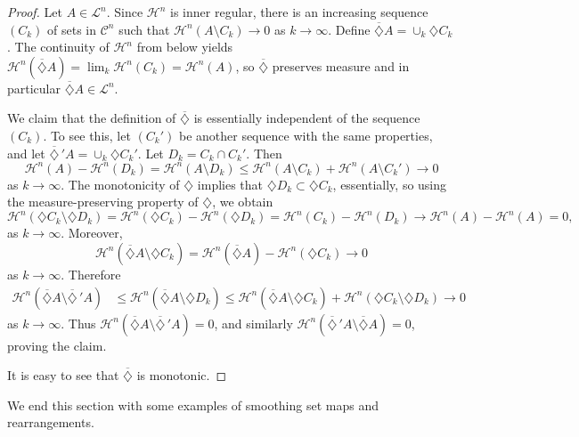 \documentclass[12pt,reqno]{amsart}
\newcommand{\cH}{{\mathcal H}}
\newcommand{\cL}{\mathcal L}
\newcommand{\di}{\diamondsuit}
\numberwithin{equation}{section}
\begin{document}
\begin{proof}
Let $A\in \cL^n$.  Since $\cH^n$ is inner regular, there is an increasing sequence $(C_k)$ of sets in ${\mathcal{C}}^n$ such that $\cH^n(A\setminus C_k)\to 0$ as $k\to\infty$. Define $\overline{\di} A=\cup_k \di C_k$.  The continuity of $\cH^n$ from below yields $\cH^n\left(\overline{\di}A\right)=\lim_k \cH^n(C_k)=\cH^n(A)$, so $\overline{\di}$ preserves measure and in particular $\overline{\di} A\in \cL^n$.

We claim that the definition of $\overline{\di}$ is essentially independent of the sequence $(C_k)$.  To see this, let $(C_k\!')$ be another sequence with the same properties, and let $\overline{\di}\,' A=\cup_k \di C_k\!'$. Let $D_k=C_k\cap C_k\!'$.  Then
$$\cH^n(A)-\cH^n(D_k)=\cH^n(A\setminus D_k)\le \cH^n(A\setminus C_k)+\cH^n(A\setminus C_k\!')\to 0$$
as $k\to \infty$. The monotonicity of $\di$ implies that $\di D_k\subset \di C_k$, essentially, so using the measure-preserving property of $\di$, we obtain
\[
\cH^n(\di C_k\setminus \di D_k)=\cH^n(\di C_k)-\cH^n(\di D_k)=\cH^n(C_k)-\cH^n(D_k)\to \cH^n(A)-\cH^n(A)=0,
\]
as $k\to\infty$.  Moreover,
$$\cH^n\left(\overline{\di} A\setminus\di C_k\right)=\cH^n\left(\overline{\di} A\right)-\cH^n(\di C_k)\to 0$$
as $k\to\infty$.  Therefore
\begin{align*}
\cH^n\left(\overline{\di}A\setminus \overline{\di}\,'A\right)&\le \cH^n\left(\overline{\di} A\setminus \di D_k\right)\le \cH^n\left(\overline{\di} A\setminus \di C_k\right)+\cH^n(\di C_k\setminus \di D_k)\to 0
\end{align*}
as $k\to \infty$.  Thus $\cH^n\left(\overline{\di}A\setminus \overline{\di}\,'A\right)=0$, and similarly $\cH^n\left(\overline{\di}\,'A\setminus \overline{\di}A\right)=0$, proving the claim.

It is easy to see that $\overline{\di}$ is monotonic.
\end{proof}

We end this section with some examples of smoothing set maps and rearrangements.
\end{document}

